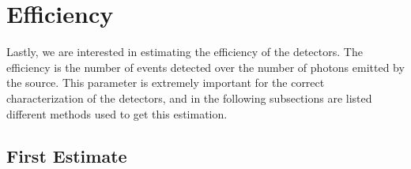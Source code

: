 \section{Efficiency}
\label{sec:efficiency}

Lastly, we are interested in estimating the efficiency of the detectors.
The efficiency is the number of events detected over the number of photons emitted by the source. This parameter is extremely important for the correct characterization of the detectors, and in the following subsections are listed different methods used to get this estimation.

\subsection{First Estimate}
\label{sub:rough}

